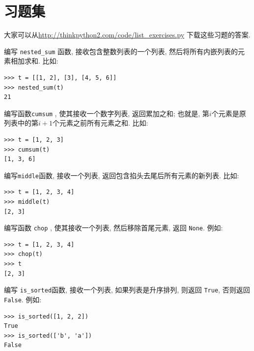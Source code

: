 \documentclass[10pt]{book}
\begin{document}
\section{习题集}

大家可以从\url{http://thinkpython2.com/code/list_exercises.py}
下载这些习题的答案.

\begin{exercise}

编写 \verb"nested_sum" 函数, 接收包含整数列表的一个列表, 
然后将所有内嵌列表的元素相加求和. 
比如:

\begin{verbatim}
>>> t = [[1, 2], [3], [4, 5, 6]]
>>> nested_sum(t)
21
\end{verbatim}

\end{exercise}

\begin{exercise}
\label{cumulative}
编写函数{\tt cumsum} , 使其接收一个数字列表, 返回累加之和;
也就是, 第$i$个元素是原列表中的第$i+1$个元素之前所有元素之和. 
比如:

\begin{verbatim}
>>> t = [1, 2, 3]
>>> cumsum(t)
[1, 3, 6]
\end{verbatim}

\end{exercise}

\begin{exercise}

编写\verb"middle"函数, 接收一个列表, 返回包含掐头去尾后所有元素的新列表. 
比如:

\begin{verbatim}
>>> t = [1, 2, 3, 4]
>>> middle(t)
[2, 3]
\end{verbatim}

\end{exercise}

\begin{exercise}
编写函数 \verb"chop" , 使其接收一个列表, 然后移除首尾元素, 返回 {\tt None}.
例如:

\begin{verbatim}
>>> t = [1, 2, 3, 4]
>>> chop(t)
>>> t
[2, 3]
\end{verbatim}

\end{exercise}


\begin{exercise}
编写 \verb"is_sorted"函数, 接收一个列表, 如果列表是升序排列, 则返回 {\tt True}, 
否则返回 {\tt False}. 例如:

\begin{verbatim}
>>> is_sorted([1, 2, 2])
True
>>> is_sorted(['b', 'a'])
False
\end{verbatim}

\end{exercise}
\end{document}
